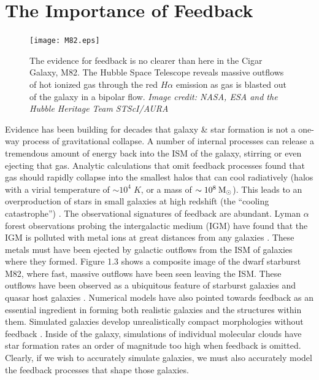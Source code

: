 \section{The Importance of Feedback}\label{intro:fb}
\begin{figure}
    \texttt{[image: M82.eps]}
	\caption[Massive outflows in M82]{The evidence for feedback is no clearer
	than here in the Cigar Galaxy, M82.  The Hubble Space Telescope reveals massive
	outflows of hot ionized gas through the red $H\alpha$ emission as gas is
	blasted out of the galaxy in a bipolar flow. \textit{Image credit: NASA, ESA
	and the Hubble Heritage Team STScI/AURA}}
\end{figure}
Evidence has been building for decades that galaxy \& star formation is not a
one-way process of gravitational collapse.  A number of internal processes can
release a tremendous amount of energy back into the ISM of the galaxy, stirring
or even ejecting that gas.  Analytic calculations that omit feedback processes
found that gas should rapidly collapse into the smallest halos that can cool
radiatively (halos with a virial temperature of $\sim 10^4\;K$, or a mass of
$\sim10^8\>{\rm M_{\odot}}$).  This leads to an overproduction of stars in small galaxies at
high redshift (the ``cooling catastrophe'') \citep{Cole2001,Benson2003}.  The
observational signatures of feedback are abundant.  Lyman $\alpha$ forest
observations probing the intergalactic medium (IGM) have found that the IGM is
polluted with metal ions at great distances from any galaxies
\citep{Sargent1988,Songaila1996,Dave1998}.  These metals must have been ejected
by galactic outflows from the ISM of galaxies where they formed. Figure 1.3
shows a composite image of the dwarf starburst M82, where fast, massive outflows
have been seen leaving the ISM.  These outflows have been observed as a
ubiquitous feature of starburst galaxies and quasar host galaxies
\citep{Veilleux2005,Werk2014}.  Numerical models have also pointed towards
feedback as an essential ingredient in forming both realistic galaxies and the
structures within them. Simulated galaxies develop unrealistically compact
morphologies without feedback \citep{Stinson2006}.  Inside of the galaxy,
simulations of individual molecular clouds have star formation rates an order of
magnitude too high \citep{Agertz2013} when feedback is omitted.  Clearly,
if we wish to accurately simulate galaxies, we must also accurately model the
feedback processes that shape those galaxies.

